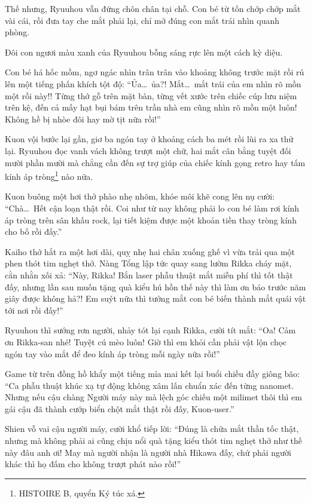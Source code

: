 \documentclass[../main.tex]{subfiles}
\begin{document}
Thế nhưng, Ryuuhou vẫn đứng chôn chân tại chỗ. Con bé từ tốn chớp chớp mắt vài cái, rồi đưa tay che mắt phải lại, chỉ mở đúng con mắt trái nhìn quanh phòng.

Đôi con ngươi màu xanh của Ryuuhou bỗng sáng rực lên một cách kỳ diệu.

Con bé há hốc mồm, ngơ ngác nhìn trân trân vào khoảng không trước mặt rồi rú lên một tiếng phấn khích tột độ: ``Ủa\dots\ ủa?! Mắt\dots\ mắt trái của em nhìn rõ mồn một rồi này!! Từng thớ gỗ trên mặt bàn, từng vết xước trên chiếc cúp lưu niệm trên kệ, đến cả mấy hạt bụi bám trên trần nhà em cũng nhìn rõ mồn một luôn! Không hề bị nhòe đôi hay mờ tịt nữa rồi!''

Kuon vội bước lại gần, giơ ba ngón tay ở khoảng cách ba mét rồi lùi ra xa thử lại. Ryuuhou đọc vanh vách không trượt một chữ, hai mắt cân bằng tuyệt đối mười phần mười mà chẳng cần đến sự trợ giúp của chiếc kính gọng retro hay tấm kính áp tròng\footnote{{\freshbot HISTOIRE B}, quyển Ký túc xá.} nào nữa.

Kuon buông một hơi thở phào nhẹ nhõm, khóe môi khẽ cong lên nụ cười: ``Chà\dots\ Hết cận loạn thật rồi. Coi như từ nay không phải lo con bé làm rơi kính áp tròng trên sân khấu rock, lại tiết kiệm được một khoản tiền thay tròng kính cho bố rồi đấy.''

Kaiho thở hắt ra một hơi dài, quỵ nhẹ hai chân xuống ghế vì vừa trải qua một phen thót tim nghẹt thở. Nàng Tổng lập tức quay sang lườm Rikka cháy mặt, cằn nhằn xối xả: ``Này, Rikka! Bắn laser phẫu thuật mắt miễn phí thì tốt thật đấy, nhưng lần sau muốn tặng quà kiểu hú hồn thế này thì làm ơn báo trước năm giây được không hả?! Em suýt nữa thì tưởng mắt con bé biến thành mắt quái vật tới nơi rồi đấy!''

Ryuuhou thì sướng rơn người, nhảy tót lại cạnh Rikka, cười tít mắt: ``Oa! Cảm ơn Rikka-san nhé! Tuyệt cú mèo luôn! Giờ thì em khỏi cần phải vật lộn chọc ngón tay vào mắt để đeo kính áp tròng mỗi ngày nữa rồi!''

Game từ trên đồng hồ khẩy một tiếng mỉa mai kết lại buổi chiều đầy giông bão: ``Ca phẫu thuật khúc xạ tự động không xâm lấn chuẩn xác đến từng nanomet. Nhưng nếu cậu chàng Người máy này mà lệch góc chiếu một milimet thôi thì em gái cậu đã thành cướp biển chột mắt thật rồi đấy, Kuon-user.''

Shien vỗ vai cậu người máy, cười khổ tiếp lời: ``Đúng là chữa mắt thần tốc thật, nhưng mà không phải ai cũng chịu nổi quà tặng kiểu thót tim nghẹt thở như thế này đâu anh ơi! May mà người nhận là người nhà Hikawa đấy, chứ phải người khác thì họ đấm cho không trượt phát nào rồi!''
\end{document}
